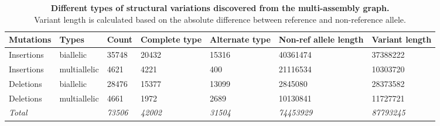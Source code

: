 \documentclass[../main.tex]{subfiles}
\begin{document}
\begin{flushleft}
\clearpage


\begin{landscape}
    \begin{table}
        \centering
        \caption[Structural variations extracted from graphs]{\textbf{Different types of structural variations discovered from the multi-assembly graph.}\\
        Variant length is calculated based on the absolute difference between reference and non-reference allele.}
        \bigskip
        \label{sup_tab:s41}
        \begin{tabular}{|l|l|l|l|l|l|l|}
        \hline
        Mutations      & Types        & Count          & Complete type  & Alternate type & Non-ref allele length & Variant length     \\
        \hline
        Insertions     & biallelic    & 35748          & 20432          & 15316          & 40361474              & 37388222           \\
        \hline
        Insertions     & multiallelic & 4621           & 4221           & 400            & 21116534              & 10303720           \\
        \hline
        Deletions      & biallelic    & 28476          & 15377          & 13099          & 2845080               & 28373582           \\
        \hline
        Deletions      & multiallelic & 4661           & 1972           & 2689           & 10130841              & 11727721           \\
        \hline
        \textit{Total} &              & \textit{73506} & \textit{42002} & \textit{31504} & \textit{74453929}     & \textit{87793245}  \\
        \hline
        \end{tabular}
    \end{table}
\end{landscape}


\end{flushleft}
\end{document}
